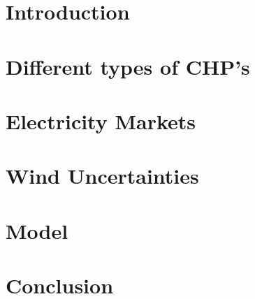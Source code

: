 \documentclass[pdftex12pt, a4paper]{book}
\newcommand{\resetfigurecounter}{\setcounter{figure}{0}}
\begin{document}
\newpage

\tableofcontents

\resetfigurecounter

\newpage

\newenvironment{abstract}{
    \onehalfspacing%
    \chapter*{\centering Abstract}%
}{}

\chapter{Introduction}
\label{s:Introduction}



%
%

\chapter{Different types of CHP's}
\label{s:TypesCHP}



\chapter{Electricity Markets}
\label{s:ElecMar}



\chapter{Wind Uncertainties}
\label{s:WindUnc}



\chapter{Model}
\label{s:Model}



\chapter{Conclusion}
\label{s:Conclusion}





%
\end{document}

